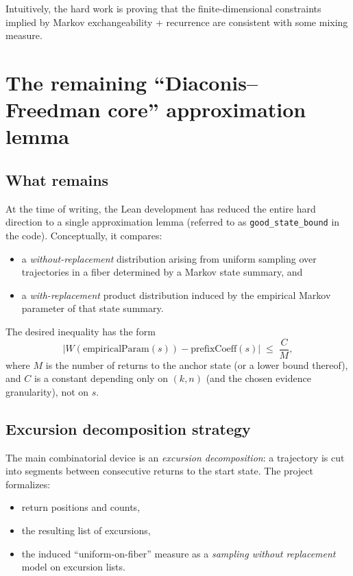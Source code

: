 \documentclass[11pt]{article}
\newcommand{\1}{\mathbf{1}}
\begin{document}
Intuitively, the hard work is proving that the finite-dimensional constraints implied by Markov exchangeability + recurrence are consistent with some mixing measure.

\section{The remaining ``Diaconis--Freedman core'' approximation lemma}

\subsection{What remains}

At the time of writing, the Lean development has reduced the entire hard direction to a single approximation lemma (referred to as \texttt{good\_state\_bound} in the code).
Conceptually, it compares:

\begin{itemize}[leftmargin=2em]
\item a \emph{without-replacement} distribution arising from uniform sampling over trajectories in a fiber determined by a Markov state summary, and
\item a \emph{with-replacement} product distribution induced by the empirical Markov parameter of that state summary.
\end{itemize}

The desired inequality has the form
\[
\left| W(\mathrm{empiricalParam}(s)) - \mathrm{prefixCoeff}(s)\right|
\;\le\; \frac{C}{M},
\]
where $M$ is the number of returns to the anchor state (or a lower bound thereof), and $C$ is a constant depending only on $(k,n)$ (and the chosen evidence granularity), not on $s$.

\subsection{Excursion decomposition strategy}

The main combinatorial device is an \emph{excursion decomposition}:
a trajectory is cut into segments between consecutive returns to the start state.
The project formalizes:

\begin{itemize}[leftmargin=2em]
\item return positions and counts,
\item the resulting list of excursions,
\item the induced ``uniform-on-fiber'' measure as a \emph{sampling without replacement} model on excursion lists.
\end{itemize}
\end{document}
